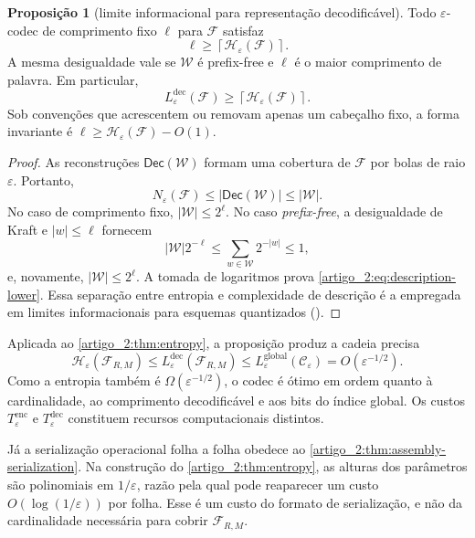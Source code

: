 \documentclass[12pt,a4paper]{article}
\makeatletter
\theoremstyle{preciso}
\theoremstyle{definition}
\theoremstyle{preciso}
\theoremstyle{preciso}
\theoremstyle{preciso}
\newtheorem{proposition}[teorema]{Proposição}
\theoremstyle{preciso}
\theoremstyle{definition}
\theoremstyle{preciso}
\theoremstyle{definition}
\theoremstyle{preciso}
\theoremstyle{preciso}
\theoremstyle{definition}
\newcommand{\abntlookup}[2]{\ifcsname ab#1@#2\endcsname\csname ab#1@#2\endcsname\else\textbf{??}\PackageWarning{abnt}{Citacao indefinida: #2}\fi}
\newcommand{\abntpar}[1]{\hyperlink{bib:#1}{\abntlookup{U}{#1}, \abntlookup{Y}{#1}}}
\newcommand{\abntsep}{}
\newcommand{\abntpitem}[1]{\abntsep\renewcommand{\abntsep}{; }\abntpar{#1}}
\newcommand{\citep}[2][]{\begingroup\renewcommand{\abntsep}{}(\forcsvlist{\abntpitem}{#2}\ifblank{#1}{}{, #1})\endgroup}
\makeatother
\begin{document}
\begin{proposition}[limite informacional para representação decodificável]\label{map:artigo_2:3.20}
\label{artigo_2:prop:description-lower}
Todo $\varepsilon$-codec de comprimento fixo $\ell$ para $\mathcal F$ satisfaz
\begin{equation}
 \ell\ge\left\lceil\mathcal H_\varepsilon(\mathcal F)\right\rceil.
 \label{artigo_2:eq:description-lower}
\end{equation}
A mesma desigualdade vale se $\mathcal W$ é prefix-free e $\ell$ é o maior
comprimento de palavra. Em particular,
\[
 L_\varepsilon^{\mathrm{dec}}(\mathcal F)
 \ge\left\lceil\mathcal H_\varepsilon(\mathcal F)\right\rceil.
\]
Sob convenções que acrescentem ou removam apenas um cabeçalho fixo, a forma
invariante é $\ell\ge\mathcal H_\varepsilon(\mathcal F)-O(1)$.
\end{proposition}

\begin{proof}
As reconstruções $\mathsf{Dec}(\mathcal W)$ formam uma cobertura de
$\mathcal F$ por bolas de raio $\varepsilon$. Portanto,
\[
 N_\varepsilon(\mathcal F)
 \le |\mathsf{Dec}(\mathcal W)|\le|\mathcal W|.
\]
No caso de comprimento fixo, $|\mathcal W|\le2^\ell$. No caso \emph{prefix-free}, a
desigualdade de Kraft e $|w|\le\ell$ fornecem
\[
 |\mathcal W|2^{-\ell}
 \le\sum_{w\in\mathcal W}2^{-|w|}\le1,
\]
e, novamente, $|\mathcal W|\le2^\ell$. A tomada de logaritmos prova
\eqref{artigo_2:eq:description-lower}. Essa separação entre entropia e complexidade de
descrição é a empregada em limites informacionais para esquemas quantizados
\citep{artigo_1-bolcskei2019}.
\end{proof}

Aplicada ao \cref{artigo_2:thm:entropy}, a proposição produz a cadeia precisa
\begin{equation}
 \mathcal H_\varepsilon(\mathcal F_{R,M})
 \le L_\varepsilon^{\mathrm{dec}}(\mathcal F_{R,M})
 \le L_\varepsilon^{\mathrm{global}}(\mathcal C_\varepsilon)
 =O(\varepsilon^{-1/2}).
 \label{artigo_2:eq:complexity-chain}
\end{equation}
Como a entropia também é $\Omega(\varepsilon^{-1/2})$, o codec é ótimo em
ordem quanto à cardinalidade, ao comprimento decodificável e aos bits do
índice global. Os custos $T_\varepsilon^{\mathrm{enc}}$ e
$T_\varepsilon^{\mathrm{dec}}$ constituem recursos computacionais distintos.

Já a serialização operacional folha a folha obedece ao
\cref{artigo_2:thm:assembly-serialization}. Na construção do \cref{artigo_2:thm:entropy}, as
alturas dos parâmetros são polinomiais em $1/\varepsilon$, razão pela qual pode
reaparecer um custo $O(\log(1/\varepsilon))$ por folha. Esse é um custo do
formato de serialização, e não da cardinalidade necessária para cobrir
$\mathcal F_{R,M}$.
\end{document}
